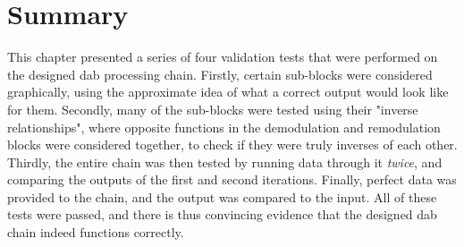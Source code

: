 \documentclass[class=report,11pt,crop=false]{standalone}
\begin{document}
\section{Summary}
This chapter presented a series of four validation tests that were performed on the designed \gls{dab} processing chain. Firstly, certain sub-blocks were considered graphically, using the approximate idea of what a correct output would look like for them. Secondly, many of the sub-blocks were tested using their "inverse relationships", where opposite functions in the demodulation and remodulation blocks were considered together, to check if they were truly inverses of each other. Thirdly, the entire chain was then tested by running data through it \emph{twice}, and comparing the outputs of the first and second iterations. Finally, perfect data was provided to the chain, and the output was compared to the input. All of these tests were passed, and there is thus convincing evidence that the designed \gls{dab} chain indeed functions correctly.

\ifstandalone

\printnoidxglossary[type=\acronymtype,nonumberlist]
\fi
\end{document}
